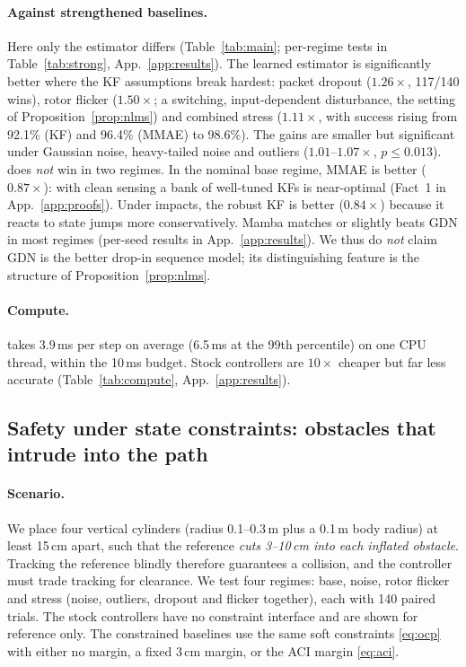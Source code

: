 \paragraph{Against strengthened baselines.}
Here only the estimator differs (Table~\ref{tab:main}; per-regime tests in Table~\ref{tab:strong}, App.~\ref{app:results}). The learned estimator is significantly better where the KF assumptions break hardest: packet dropout ($1.26\times$, 117/140 wins), rotor flicker ($1.50\times$; a switching, input-dependent disturbance, the setting of Proposition~\ref{prop:nlms}) and combined stress ($1.11\times$, with success rising from 92.1\% (KF) and 96.4\% (MMAE) to 98.6\%).
The gains are smaller but significant under Gaussian noise, heavy-tailed noise and outliers ($1.01$--$1.07\times$, $p\le 0.013$).
\ours{} does \emph{not} win in two regimes. In the nominal base regime, MMAE is better ($0.87\times$): with clean sensing a bank of well-tuned KFs is near-optimal (Fact~1 in App.~\ref{app:proofs}). Under impacts, the robust KF is better ($0.84\times$) because it reacts to state jumps more conservatively.
Mamba matches or slightly beats GDN in most regimes (per-seed results in App.~\ref{app:results}). We thus do \emph{not} claim GDN is the better drop-in sequence model; its distinguishing feature is the structure of Proposition~\ref{prop:nlms}.

\paragraph{Compute.}
\ours{} takes 3.9\,ms per step on average (6.5\,ms at the 99th percentile) on one CPU thread, within the 10\,ms budget. Stock controllers are $10\times$ cheaper but far less accurate (Table~\ref{tab:compute}, App.~\ref{app:results}).

\subsection{Safety under state constraints: obstacles that intrude into the path}
\label{sec:exp-obstacles}

\paragraph{Scenario.}
We place four vertical cylinders (radius 0.1--0.3\,m plus a 0.1\,m body radius) at least 15\,cm apart, such that the reference \emph{cuts 3--10\,cm into each inflated obstacle}. Tracking the reference blindly therefore guarantees a collision, and the controller must trade tracking for clearance.
We test four regimes: base, noise, rotor flicker and stress (noise, outliers, dropout and flicker together), each with 140 paired trials. The stock controllers have no constraint interface and are shown for reference only.
The constrained baselines use the same soft constraints \eqref{eq:ocp} with either no margin, a fixed 3\,cm margin, or the ACI margin \eqref{eq:aci}.

